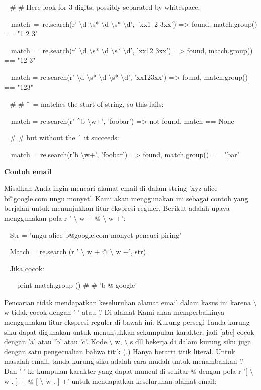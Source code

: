 \begin{12pt}
\begin{12pt}
\noindent 
~  $  \#  $ $  \#  $ Here look for 3 digits, possibly separated by whitespace. \par
\noindent 
~~match~=~re.search(r' $  \setminus  $d $  \setminus  $s* $  \setminus  $d $  \setminus  $s* $  \setminus  $d',~'xx1~2   3xx') =>  found, match.group() == "1 2   3" \par
\noindent 
~~match~=~re.search(r' $  \setminus  $d $  \setminus  $s* $  \setminus  $d $  \setminus  $s* $  \setminus  $d', 'xx12  3xx') =>  found, match.group() == "12  3" \par
\noindent 
~~match = re.search(r' $  \setminus  $d $  \setminus  $s* $  \setminus  $d $  \setminus  $s* $  \setminus  $d', 'xx123xx') =>  found, match.group() == "123" \par
\vspace{12pt}
\noindent 
~  $  \#  $ $  \#  $  $  \string^  $ = matches the start of string, so this fails: \par
\noindent 
~~match = re.search(r' $  \string^  $b $  \setminus  $w+', 'foobar') =>  not found, match == None \par
\noindent 
~  $  \#  $ $  \#  $ but without the  $  \string^  $ it succeeds: \par
\noindent 
~~match = re.search(r'b $  \setminus  $w+', 'foobar') =>  found, match.group() == "bar" \par
\vspace{12pt}
\vspace{12pt}
\noindent 
{\fontsize{14pt}{14pt}\selectfont \textbf{Contoh email} \\} \par
Misalkan Anda ingin mencari alamat email di dalam string 'xyz alice-b@google.com ungu monyet'. Kami akan menggunakan ini sebagai contoh yang berjalan untuk menunjukkan fitur ekspresi reguler. Berikut adalah upaya menggunakan pola r ' $  \setminus  $ w + @  $  \setminus  $ w +': \par
\vspace{12pt}
\noindent 
~ Str = 'ungu alice-b@google.com monyet pencuci piring' \par
\noindent 
~ Match = re.search (r ' $  \setminus  $ w + @  $  \setminus  $ w +', str) \par
\noindent 
~ Jika cocok: \par
\noindent 
~~~ print match.group ()  $  \#  $ $  \#  $ 'b @ google' \par
\vspace{12pt}
Pencarian tidak mendapatkan keseluruhan alamat email dalam kasus ini karena  $  \setminus  $ w tidak cocok dengan '-' atau '.' Di alamat Kami akan memperbaikinya menggunakan fitur ekspresi reguler di bawah ini. Kurung persegi Tanda kurung siku dapat digunakan untuk menunjukkan sekumpulan karakter, jadi [abc] cocok dengan 'a' atau 'b' atau 'c'. Kode  $  \setminus  $ w,  $  \setminus  $ s dll bekerja di dalam kurung siku juga dengan satu pengecualian bahwa titik (.) Hanya berarti titik literal. Untuk masalah email, tanda kurung siku adalah cara mudah untuk menambahkan '.' Dan '-' ke kumpulan karakter yang dapat muncul di sekitar @ dengan pola r '[ $  \setminus  $ w .-] + @ [ $  \setminus  $ w .-] +' untuk mendapatkan keseluruhan alamat email: \par

\end{12pt}
\end{12pt}
